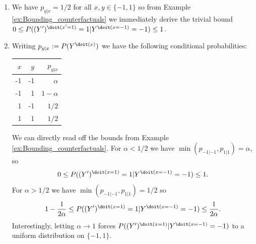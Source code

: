 \begin{enumerate}
\begin{ungradedsolution}
\begin{enumerate}
			\item We have $p_{y|x}=1/2$ for all $x, y\in\{-1,1\}$ so from Example \ref*{ex:Bounding_counterfactuals} we immediately derive the trivial bound $0 \leq P((Y')^{\doit(x'=1)}=1|Y^{\doit(x=-1)}=-1) \leq 1$.
			\item Writing $p_{y|x} := P(Y^{\doit(x)})$ we have the following conditional probabilities:
			\begin{center}\begin{tabular}{rrr}
					$x$ & $y$ & $p_{y|x}$  \\
					\hline
					-1  & -1  & $\alpha$   \\ %
					-1  & 1   & $1-\alpha$ \\ %
					1   & -1  & $1/2$      \\ %
					1   & 1   & $1/2$      \\ %
				\end{tabular}\end{center}
			We can directly read off the bounds from Example \ref*{ex:Bounding_counterfactuals}. For $\alpha < 1/2$ we have $\min(p_{-1|-1}, p_{1|1}) = \alpha$, so
			$$0 \le P((Y')^{\doit(x=1)} = 1 | Y^{\doit(x=-1)}=-1) \le 1.$$
			For $\alpha > 1/2$ we have $\min(p_{-1|-1}, p_{1|1}) = 1/2$ so
			$$1 - \frac{1}{2\alpha} \le P((Y')^{\doit(x=1)} = 1 | Y^{\doit(x=-1)}=-1) \le \frac{1}{2\alpha}.$$
			Interestingly, letting $\alpha \to 1$ forces $P((Y')^{\doit(x=1)} | Y^{\doit(x=-1)}=-1)$ to a uniform distribution on $\{-1,1\}$.
		\end{enumerate}
	\end{ungradedsolution}


\end{enumerate}
